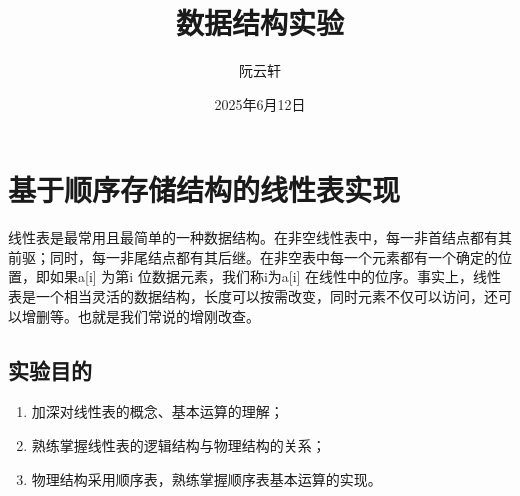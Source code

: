 \documentclass[supercite]{Experimental_Report}
\title{~~~~~~数据结构实验~~~~~~}
\author{阮云轩}
\date{2025年6月12日}
\theoremstyle{definition}
\begin{document}
	
	\maketitle
	
	\clearpage
	
	
	\tableofcontents[level=2]
	
	\clearpage
	
	
	\section{基于顺序存储结构的线性表实现}
	
	线性表是最常用且最简单的一种数据结构。在非空线性表中，每一非首结点都有其前驱；同时，每一非尾结点都有其后继。在非空表中每一个元素都有一个确定的位置，即如果a[i] 为第i 位数据元素，我们称i为a[i] 在线性中的位序。事实上，线性表是一个相当灵活的数据结构，长度可以按需改变，同时元素不仅可以访问，还可以增删等。也就是我们常说的增刚改查。
	
	\subsection{实验目的}
	\begin{enumerate}
		\renewcommand{\labelenumi}{\theenumi)}
		\item 加深对线性表的概念、基本运算的理解；
		\item 熟练掌握线性表的逻辑结构与物理结构的关系；
		\item 物理结构采用顺序表，熟练掌握顺序表基本运算的实现。
	\end{enumerate}
	
\end{document}
